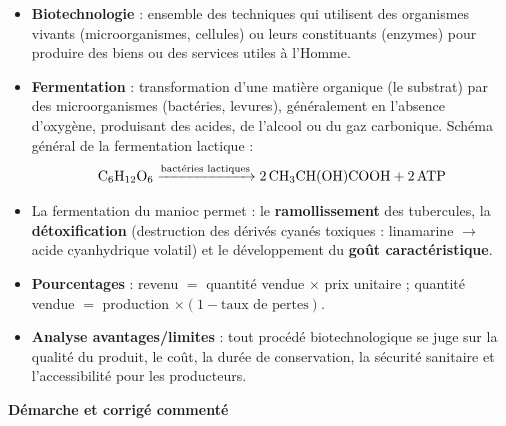 \documentclass[11pt]{article}
\newcommand{\cle}[1]{{\popxbold\color{popdark}#1}}
\begin{document}
\begin{aretenir}
\begin{itemize}
\item \textbf{Biotechnologie} : ensemble des techniques qui utilisent des organismes vivants (microorganismes, cellules) ou leurs constituants (enzymes) pour produire des biens ou des services utiles à l'Homme.
\item \textbf{Fermentation} : transformation d'une matière organique (le \cle{substrat}) par des microorganismes (bactéries, levures), généralement en l'absence d'oxygène, produisant des acides, de l'alcool ou du gaz carbonique. Schéma général de la fermentation lactique :
\[ \ce{C6H12O6 ->[$\text{bactéries lactiques}$] 2 CH3CH(OH)COOH + 2 ATP} \]
\item La fermentation du manioc permet : le \textbf{ramollissement} des tubercules, la \textbf{détoxification} (destruction des dérivés cyanés toxiques : linamarine $\rightarrow$ acide cyanhydrique volatil) et le développement du \textbf{goût caractéristique}.
\item \textbf{Pourcentages} : revenu $=$ quantité vendue $\times$ prix unitaire ; quantité vendue $=$ production $\times (1 - \text{taux de pertes})$.
\item \textbf{Analyse avantages/limites} : tout procédé biotechnologique se juge sur la qualité du produit, le coût, la durée de conservation, la sécurité sanitaire et l'accessibilité pour les producteurs.
\end{itemize}
\end{aretenir}

\textbf{Démarche et corrigé commenté}
\end{document}
